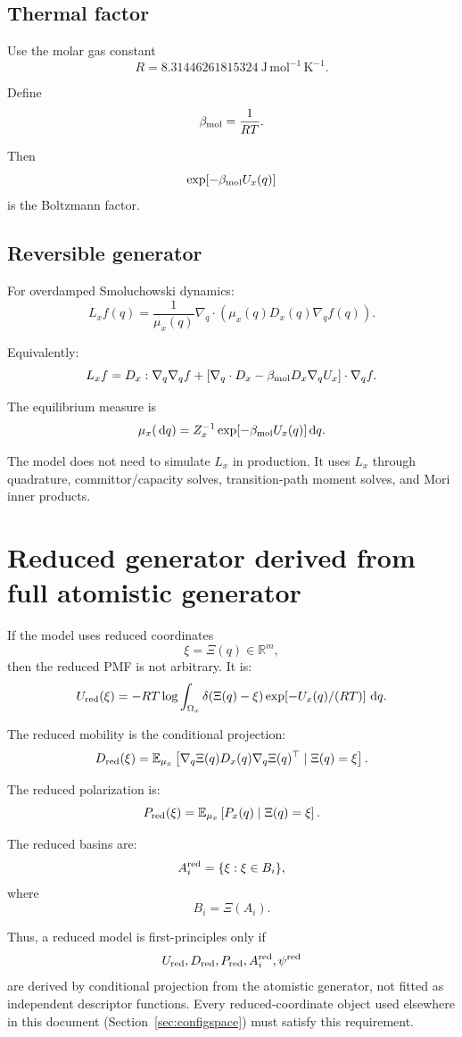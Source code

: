 \documentclass[11pt]{article}
\newcommand{\dd}{\,\mathrm d}
\newcommand{\E}{\mathbb E}
\begin{document}
\subsection{Thermal factor}

Use the molar gas constant
\[
R=8.31446261815324\ \mathrm{J\,mol^{-1}\,K^{-1}}.
\]

Define
\[
\beta_{\rm mol}=\frac{1}{RT}.
\]

Then
\[
\exp[-\beta_{\rm mol}U_x(q)]
\]
is the Boltzmann factor.

\subsection{Reversible generator}

For overdamped Smoluchowski dynamics:
\[
L_x f(q)
=
\frac{1}{\mu_x(q)}
\nabla_q\cdot
\left(
\mu_x(q)D_x(q)\nabla_q f(q)
\right).
\]

Equivalently:
\[
L_x f
=
D_x:\nabla_q\nabla_q f
+
\left[
\nabla_q\cdot D_x
-
\beta_{\rm mol}D_x\nabla_q U_x
\right]\cdot\nabla_q f.
\]

The equilibrium measure is
\[
\mu_x(\dd q)
=
Z_x^{-1}
\exp[-\beta_{\rm mol}U_x(q)]
\dd q.
\]

The model does not need to simulate \(L_x\) in production. It uses \(L_x\)
through quadrature, committor/capacity solves, transition-path moment solves,
and Mori inner products.

\section{Reduced generator derived from full atomistic generator}
\label{sec:reduced}

If the model uses reduced coordinates
\[
\xi=\Xi(q)\in\mathbb R^m,
\]
then the reduced PMF is not arbitrary. It is:
\[
U_{\rm red}(\xi)
=
-RT
\log
\int_{\Omega_x}
\delta(\Xi(q)-\xi)
\exp[-U_x(q)/(RT)]\,\dd q.
\]

The reduced mobility is the conditional projection:
\[
D_{\rm red}(\xi)
=
\E_{\mu_x}
\left[
\nabla_q\Xi(q)D_x(q)\nabla_q\Xi(q)^\top
\mid
\Xi(q)=\xi
\right].
\]

The reduced polarization is:
\[
P_{\rm red}(\xi)
=
\E_{\mu_x}
\left[
P_x(q)\mid\Xi(q)=\xi
\right].
\]

The reduced basins are:
\[
A_i^{\rm red}
=
\{\xi:\xi\in B_i\},
\]
where
\[
B_i=\Xi(A_i).
\]

Thus, a reduced model is first-principles only if
\[
U_{\rm red},D_{\rm red},P_{\rm red},A_i^{\rm red},\psi^{\rm red}
\]
are derived by conditional projection from the atomistic generator, not fitted
as independent descriptor functions. Every reduced-coordinate object used
elsewhere in this document (Section~\ref{sec:configspace}) must satisfy this
requirement.
\end{document}
